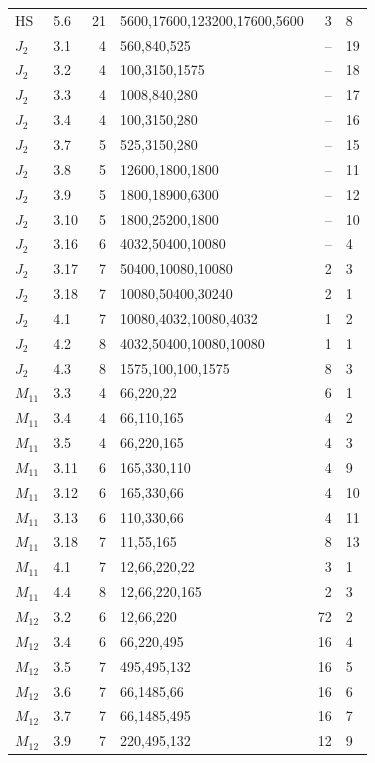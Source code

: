 \begin{longtable}{@{}llrlrl@{}}
$\mathrm{HS}$ & 5.6 & 21 & 5600,17600,123200,17600,5600 & 3 & 8 \\
$J_{2}$ & 3.1 & 4 & 560,840,525 & -- & 19 \\
$J_{2}$ & 3.2 & 4 & 100,3150,1575 & -- & 18 \\
$J_{2}$ & 3.3 & 4 & 1008,840,280 & -- & 17 \\
$J_{2}$ & 3.4 & 4 & 100,3150,280 & -- & 16 \\
$J_{2}$ & 3.7 & 5 & 525,3150,280 & -- & 15 \\
$J_{2}$ & 3.8 & 5 & 12600,1800,1800 & -- & 11 \\
$J_{2}$ & 3.9 & 5 & 1800,18900,6300 & -- & 12 \\
$J_{2}$ & 3.10 & 5 & 1800,25200,1800 & -- & 10 \\
$J_{2}$ & 3.16 & 6 & 4032,50400,10080 & -- & 4 \\
$J_{2}$ & 3.17 & 7 & 50400,10080,10080 & 2 & 3 \\
$J_{2}$ & 3.18 & 7 & 10080,50400,30240 & 2 & 1 \\
$J_{2}$ & 4.1 & 7 & 10080,4032,10080,4032 & 1 & 2 \\
$J_{2}$ & 4.2 & 8 & 4032,50400,10080,10080 & 1 & 1 \\
$J_{2}$ & 4.3 & 8 & 1575,100,100,1575 & 8 & 3 \\
$M_{11}$ & 3.3 & 4 & 66,220,22 & 6 & 1 \\
$M_{11}$ & 3.4 & 4 & 66,110,165 & 4 & 2 \\
$M_{11}$ & 3.5 & 4 & 66,220,165 & 4 & 3 \\
$M_{11}$ & 3.11 & 6 & 165,330,110 & 4 & 9 \\
$M_{11}$ & 3.12 & 6 & 165,330,66 & 4 & 10 \\
$M_{11}$ & 3.13 & 6 & 110,330,66 & 4 & 11 \\
$M_{11}$ & 3.18 & 7 & 11,55,165 & 8 & 13 \\
$M_{11}$ & 4.1 & 7 & 12,66,220,22 & 3 & 1 \\
$M_{11}$ & 4.4 & 8 & 12,66,220,165 & 2 & 3 \\
$M_{12}$ & 3.2 & 6 & 12,66,220 & 72 & 2 \\
$M_{12}$ & 3.4 & 6 & 66,220,495 & 16 & 4 \\
$M_{12}$ & 3.5 & 7 & 495,495,132 & 16 & 5 \\
$M_{12}$ & 3.6 & 7 & 66,1485,66 & 16 & 6 \\
$M_{12}$ & 3.7 & 7 & 66,1485,495 & 16 & 7 \\
$M_{12}$ & 3.9 & 7 & 220,495,132 & 12 & 9 \\

\end{longtable}
